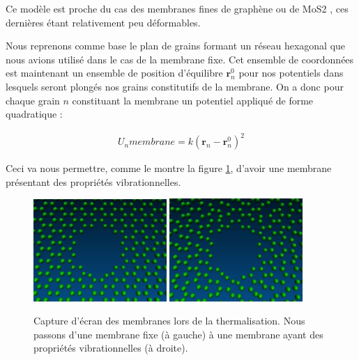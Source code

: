 Ce modèle est proche du cas des membranes fines de graphène \cite{Schneider2010} ou de MoS2 \cite{Feng2015,2Feng2015}, ces dernières étant relativement peu déformables.

Nous reprenons comme base le plan de grains formant un réseau hexagonal que nous avions utilisé dans le cas de la membrane fixe. Cet ensemble de coordonnées est maintenant un ensemble de position d'équilibre $\textbf{r}_n^{0}$ pour nos potentiels dans lesquels seront plongés nos grains constitutifs de la membrane. On a donc pour chaque grain $n$ constituant la membrane un potentiel appliqué de forme quadratique \cite{serway2004physics}:

\begin{center}
\begin{eqnarray}
U_{n}membrane=k(\textbf{r}_n-\textbf{r}_n^{0})^2
\end{eqnarray}
\end{center}
Ceci va nous permettre, comme le montre la figure \ref{2membranes}, d'avoir une membrane présentant des propriétés vibrationnelles.


\begin{figure}[H]
\begin{center}
\includegraphics[width=0.45\textwidth]{reseaufix.jpg} \hspace{0.04\textwidth}\includegraphics[width=0.45\textwidth]{reseauvib.jpg}

\caption[vibrations de la membrane]{Capture d'écran des membranes lors de la thermalisation. Nous passons d'une membrane fixe (à gauche) à une membrane ayant des propriétés vibrationnelles (à droite).}
\label{2membranes}
\end{center}
\end{figure}

